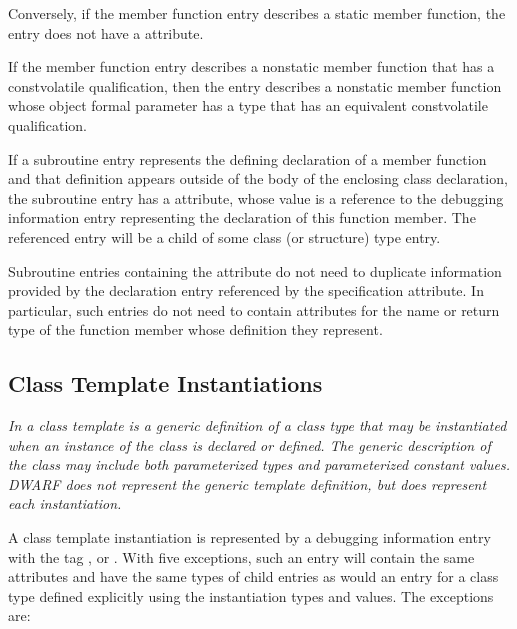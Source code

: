 Conversely, if the member function entry describes a static
member function, the entry does not have 
a 
attribute.

If the member function entry describes a non\dash static member
function that has a const\dash volatile qualification, then
the entry describes a non\dash static member function whose
object formal parameter has a type that has an equivalent
const\dash volatile qualification.

If a subroutine entry represents the defining declaration
of a member function and that definition appears outside of
the body of the enclosing class declaration, the subroutine
entry has a 
 attribute, 
whose value is
a reference to the debugging information entry representing
the declaration of this function member. The referenced entry
will be a child of some class (or structure) type entry.

Subroutine entries containing the
 attribute 
do not need to duplicate information provided
by the declaration entry referenced by the specification
attribute. In particular, such entries do not need to contain
attributes for the name or return type of the function member
whose definition they represent.

\subsection{Class Template Instantiations}
\label{chap:classtemplateinstantiations}

\textit{In  a class template is a generic definition of a class
type that may be instantiated when an instance of the class
is declared or defined. The generic description of the
class may include both parameterized types and parameterized
constant values. DWARF does not represent the generic template
definition, but does represent each instantiation.}

A class template instantiation is represented by a
debugging information entry with the tag ,
 or 
. With five
exceptions, such an entry will contain the same attributes
and have the same types of child entries as would an entry
for a class type defined explicitly using the instantiation
types and values. The exceptions are:

